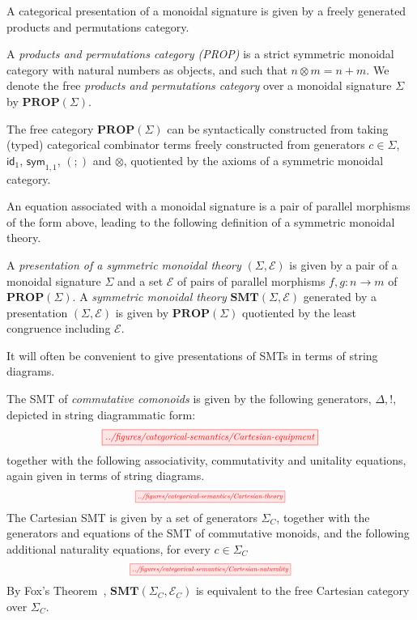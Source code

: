 \documentclass[sigconf, 9pt, nonacm]{acmart}
\newcommand\sym{\textsf{sym}}
\begin{document}
A categorical presentation of a monoidal signature is given by a freely generated products and permutations category.  
\begin{definition}
A \textit{products and permutations category (PROP)} is a strict symmetric monoidal category with natural numbers as objects,  and such that $n \otimes m = n+m$.
We denote the free \textit{products and permutations category} over a monoidal signature $\Sigma$ by $\textbf{PROP}(\Sigma)$.  
\end{definition}
The free category $\textbf{PROP}(\Sigma)$ can be syntactically constructed from taking (typed) categorical combinator terms freely constructed from generators $c \in \Sigma$, $\textsf{id}_1$, $\sym_{1,1}$, $(;\!)$ and $\otimes$, quotiented by the axioms of a symmetric monoidal category.

An equation associated with a monoidal signature is a pair of parallel morphisms of the form above, leading to the following definition of a symmetric monoidal theory. 
\begin{definition}
A \textit{presentation of a symmetric monoidal theory} $(\Sigma, \mathcal{E})$ is given by a pair of a monoidal signature $\Sigma$ and a set $\mathcal{E}$ of pairs of parallel morphisms $f,g: n \to m$ of $\textbf{PROP}(\Sigma)$.
A \textit{symmetric monoidal theory} $\textbf{SMT}(\Sigma,\mathcal{E})$ generated by a presentation $(\Sigma, \mathcal{E})$ is given by $\textbf{PROP}(\Sigma)$ quotiented by the least congruence including $\mathcal{E}$.
\end{definition}

It will often be convenient to give presentations of SMTs in terms of string diagrams.
\begin{example}
\label{example:csmt}
The SMT of \textit{commutative comonoids} is given by the following generators, ${\Delta, !}$, depicted in string diagrammatic form:
\[
	\scalebox{0.8}{
  	 \tikzfig{../figures/categorical-semantics/Cartesian-equipment}
	}
\]
together with the following associativity, commutativity and unitality equations, again given in terms of string diagrams. 
\[
	\scalebox{0.6}{
	\tikzfig{../figures/categorical-semantics/Cartesian-theory}	
	}
\]
The Cartesian SMT is given by a set of generators $\Sigma_C$, together with the generators and equations of the SMT of commutative monoids, and the following additional naturality equations, for every $c \in \Sigma_C$
\[
	\scalebox{0.6}{
	\tikzfig{../figures/categorical-semantics/Cartesian-naturality}
	}
\]
By Fox's Theorem~\cite{fox},  $\textbf{SMT}(\Sigma_C, \mathcal{E}_C)$ is equivalent to the free Cartesian category over $\Sigma_C$. 
\end{example}
\end{document}
